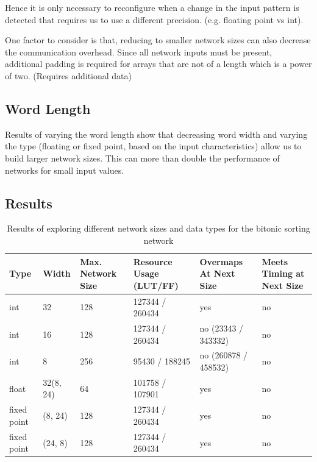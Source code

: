Hence it is only necessary to reconfigure when a change in the input
pattern is detected that requires us to use a different
precision. (e.g. floating point vs int).

One factor to consider is that, reducing to smaller network sizes can
also decrease the communication overhead. Since all network inputs
must be present, additional padding is required for arrays that are
not of a length which is a power of two. (Requires additional data)


\subsection{Word Length}

Results of varying the word length show that decreasing word width and
varying the type (floating or fixed point, based on the input
characteristics) allow us to build larger network sizes. This can more
than double the performance of networks for small input values.

\subsection{Results}

\begin{table}[!ht]
  \begin{tabularx}{\textwidth}{X | X | X | X | X | X}
    \hline
    Type & Width & Max. Network Size & Resource Usage (LUT/FF) & Overmaps At Next Size & Meets Timing at Next Size \\
    \hline
    \hline
    int & 32 & 128 & 127344 / 260434 & yes & no \\
    \hline
    int & 16 & 128 & 127344 / 260434 & no (23343 / 343332) & no \\
    \hline
    int & 8 & 256 & 95430 / 188245 & no (260878 / 458532) & no \\
    \hline
    float & 32(8, 24) & 64 & 101758 / 107901 & yes & no \\
    \hline
    fixed point & (8, 24) & 128 & 127344 / 260434 & yes & no \\
    \hline
    fixed point & (24, 8) & 128 & 127344 / 260434 & yes & no \\
  \end{tabularx}
  \caption{Results of exploring different network sizes and data types for the bitonic sorting network}
\end{table}

